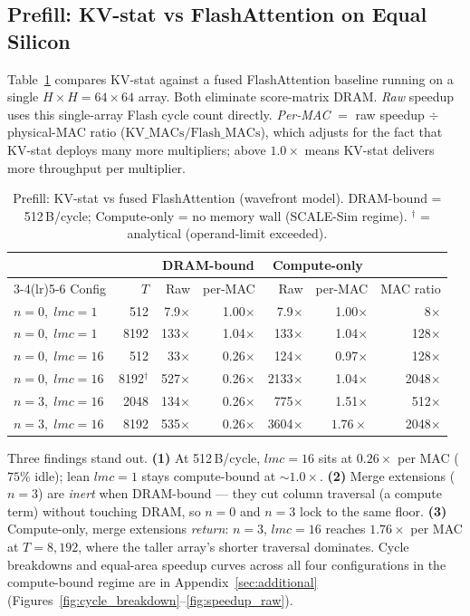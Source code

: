 \documentclass[11pt]{article}
\begin{document}
\subsection{Prefill: KV-stat vs FlashAttention on Equal Silicon}

Table~\ref{tab:prefill_results} compares KV-stat against a fused FlashAttention
baseline running on a single $H{\times}H{=}64{\times}64$ array.
Both eliminate score-matrix DRAM.
\emph{Raw} speedup uses this single-array Flash cycle count directly.
\emph{Per-MAC} $=$ raw speedup $\div$ physical-MAC ratio
($\text{KV\_MACs}/\text{Flash\_MACs}$), which adjusts for the fact that KV-stat
deploys many more multipliers; above $1.0\times$ means KV-stat delivers more
throughput per multiplier.

\begin{table}[H]
\centering
\caption{Prefill: KV-stat vs fused FlashAttention (wavefront model).
DRAM-bound = 512\,B/cycle; Compute-only = no memory wall (SCALE-Sim regime).
$^\dagger$ = analytical (operand-limit exceeded).}
\label{tab:prefill_results}
\small
\begin{tabular}{lr rr rr r}
\toprule
& & \multicolumn{2}{c}{DRAM-bound} & \multicolumn{2}{c}{Compute-only} & \\
\cmidrule(lr){3-4}\cmidrule(lr){5-6}
Config & $T$ & Raw & per-MAC & Raw & per-MAC & MAC ratio \\
\midrule
$n{=}0,\;lmc{=}1$  &  512 &   7.9$\times$ & 1.00$\times$ &   7.9$\times$ & 1.00$\times$ &     8$\times$ \\
$n{=}0,\;lmc{=}1$  & 8192 & 133$\times$   & 1.04$\times$ & 133$\times$   & 1.04$\times$ &   128$\times$ \\
\midrule
$n{=}0,\;lmc{=}16$ &  512 &  33$\times$   & 0.26$\times$ & 124$\times$   & 0.97$\times$ &   128$\times$ \\
$n{=}0,\;lmc{=}16$ & 8192$^\dagger$ & 527$\times$ & 0.26$\times$ & 2133$\times$ & 1.04$\times$ & 2048$\times$ \\
\midrule
$n{=}3,\;lmc{=}16$ & 2048 & 134$\times$   & 0.26$\times$ & 775$\times$   & 1.51$\times$ &   512$\times$ \\
$n{=}3,\;lmc{=}16$ & 8192 & 535$\times$   & 0.26$\times$ & 3604$\times$  & $\mathbf{1.76\times}$ & 2048$\times$ \\
\bottomrule
\end{tabular}
\end{table}

Three findings stand out.
\textbf{(1)} At 512\,B/cycle, $lmc{=}16$ sits at $0.26\times$ per MAC ($75\%$
idle); lean $lmc{=}1$ stays compute-bound at $\sim\!1.0\times$.
\textbf{(2)} Merge extensions ($n{=}3$) are \emph{inert} when DRAM-bound --- they
cut column traversal (a compute term) without touching DRAM, so $n{=}0$ and
$n{=}3$ lock to the same floor.
\textbf{(3)} Compute-only, merge extensions \emph{return}: $n{=}3$, $lmc{=}16$
reaches $\mathbf{1.76\times}$ per MAC at $T{=}8{,}192$, where the taller array's
shorter traversal dominates.
Cycle breakdowns and equal-area speedup curves across all four configurations
in the compute-bound regime are in Appendix~\ref{sec:additional}
(Figures~\ref{fig:cycle_breakdown}--\ref{fig:speedup_raw}).
\end{document}
